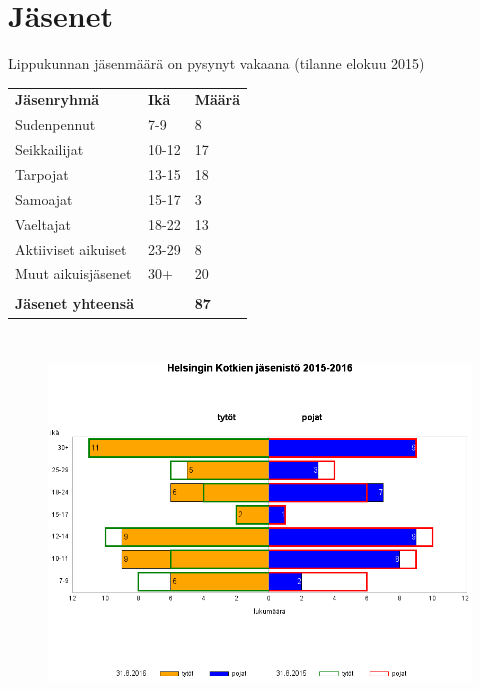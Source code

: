 \section{Jäsenet}
Lippukunnan jäsenmäärä on pysynyt vakaana (tilanne elokuu 2015)\\
\begin{center}
\begin{tabular}{ l l l }
	\textbf{Jäsenryhmä} & \textbf{Ikä} & \textbf{Määrä}\\
	Sudenpennut & 7-9 & 8\\
	Seikkailijat & 10-12 & 17\\
	Tarpojat & 13-15 & 18\\
	Samoajat & 15-17 & 3\\
	Vaeltajat & 18-22 & 13\\
	Aktiiviset aikuiset & 23-29 & 8\\
	Muut aikuisjäsenet & 30+ & 20\\
				   & & \\
	\textbf{Jäsenet yhteensä} & & \textbf{87}
\end{tabular}
\begin{figure}[htb]
	\begin{center}
		\includegraphics[height=10cm]{kuvat/jasenet.png}
	\end{center}
\end{figure}


\end{center}
